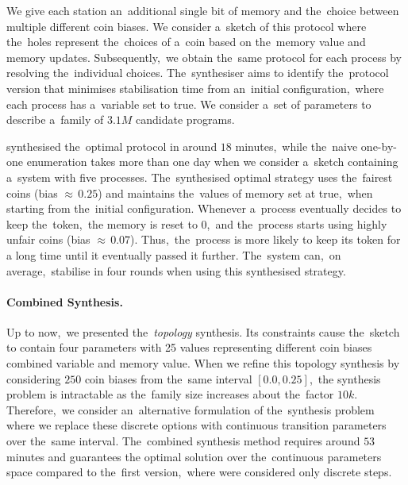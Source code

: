 We give each station an~additional single bit of memory and the~choice between multiple different coin biases.
We consider a~sketch of this protocol where the~holes represent the~choices of a~coin based on the~memory value and memory updates.
Subsequently,~we obtain the~same protocol for each process by resolving the~individual choices.
The~synthesiser aims to identify the~protocol version that minimises stabilisation time from an~initial configuration,~where each process has a~variable set to true.
We consider a~set of parameters to describe a~family of $3.1M$ candidate programs.

\toolname{} synthesised the~optimal protocol in around $18$ minutes,~while the~naive one-by-one enumeration takes more than one day when we consider a~sketch containing a~system with five processes.
The~synthesised optimal strategy uses the~fairest coins (bias ${\approx} \, 0.25$) and maintains the~values of memory set at true,~when starting from the~initial configuration.
Whenever a~process eventually decides to keep the~token,~the memory is reset to $0$,~and the~process starts using highly unfair coins (bias ${\approx} \, 0.07$). 
Thus,~the~process is more likely to keep its token for a long time until it eventually passed it further.
The~system can,~on average,~stabilise in four rounds when using this synthesised strategy.

\paragraph{Combined Synthesis.}
Up to now,~we presented the~\textit{topology} synthesis.
Its constraints cause the~sketch to contain four parameters with 25 values representing different coin biases combined variable and memory value.
When we refine this topology synthesis by considering $250$ coin biases from the~same interval $[0.0, 0.25]$,~the synthesis problem is intractable as the~family size increases about the~factor $10k$.
Therefore,~we consider an~alternative formulation of the~synthesis problem where we replace these discrete options with continuous transition parameters over the~same interval.
The~combined synthesis method requires around $53$ minutes and guarantees the optimal solution over the~continuous parameters space compared to the~first version,~where were considered only discrete steps.

